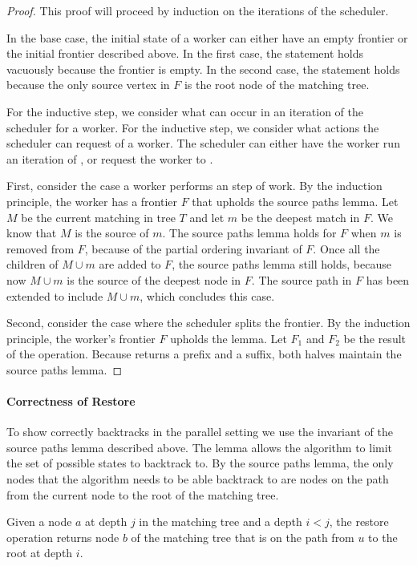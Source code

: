 \begin{proof}
This proof will proceed by induction on the iterations
of the scheduler.

In the base case, the initial state of a worker can either have an
empty frontier or the initial frontier
described above.
%
In the first case, the statement holds vacuously
because the frontier is empty.
%
In the second case, the statement holds because the only
source vertex in $F$ is the root node of the matching tree.

For the inductive step, we consider what can occur
in an iteration of the scheduler for a worker.
%
For the inductive step, we consider what actions
the scheduler can request of a worker.
The scheduler can either have the worker run an iteration of ,
or request the worker to .

First, consider the case a worker performs an step of work.
%
By the induction principle, the worker has a
frontier $F$ that upholds the source paths lemma.
%
Let $M$ be the current matching in tree $T$ and let $m$ be the deepest
match in $F$.
%
We know that $M$ is the source of $m$.
%
The source paths lemma holds for $F$ when $m$ is
removed from $F$, because of the partial ordering invariant of $F$.
%
Once all the children of $M \cup m$ are added to $F$,
the source paths lemma still holds, because now
$M \cup m$ is the source of the deepest node in $F$.
%
The source path in $F$ has been extended to include
$M \cup m$, which concludes this case.

Second, consider the case where the scheduler splits the frontier.
%
By the induction principle, the worker's frontier $F$
upholds the lemma.
%
Let $F_1$ and $F_2$ be the result of the  operation.
%
Because  returns a prefix and a suffix, both halves maintain
the source paths lemma.
\end{proof}

\paragraph{Correctness of Restore}
To show  correctly backtracks
in the parallel setting we use the invariant
of the source paths lemma described above.
%
The lemma allows the algorithm to limit
the set of possible states to backtrack to.
%
By the source paths lemma, the only nodes
that the algorithm needs to be able backtrack to
are nodes on the path from the current node to the root
of the matching tree.

\begin{theorem}
  Given a node $a$ at depth $j$ in the matching tree and a depth $i < j$,
  the restore operation returns node $b$ of the matching tree that
  is on the path from $u$ to the root at depth $i$.
\end{theorem}

